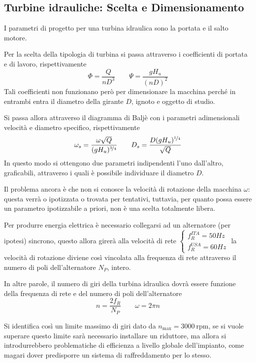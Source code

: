 \documentclass[a4paper, 15pt]{article}
\begin{document}
\subsection{Turbine idrauliche: Scelta e Dimensionamento}		
\begin{adjustwidth}{2in}{}
	I parametri di progetto per una turbina idraulica sono la portata e il salto motore. 
	
	Per la scelta della tipologia di turbina si passa attraverso i coefficienti di portata e di lavoro, rispettivamente
	\[\Phi = \dfrac{Q}{nD^3}\qquad\Psi=\dfrac{gH_u}{(nD)^2}\]
	Tali coefficienti non funzionano però per dimensionare la macchina perché in entrambi entra il diametro della girante $D$, ignoto e oggetto di studio. \newline 
	
	Si passa allora attraverso il diagramma di Baljè con i parametri adimensionali velocità e diametro specifico, rispettivamente
	\[\omega_s = \dfrac{\omega\sqrt{Q}}{(gH_u)^{\nicefrac{3}{4}}}\qquad D_s = \dfrac{D(gH_u)^{\nicefrac{1}{4}}}{\sqrt{Q}}\]
	In questo modo si ottengono due parametri indipendenti l'uno dall'altro, graficabili, attraverso i quali è possibile individuare il diametro $D$. \newline 
	
	Il problema ancora è che non si conosce la velocità di rotazione della macchina $\omega$: questa verrà o ipotizzata o trovata per tentativi, tuttavia, per quanto possa essere un parametro ipotizzabile a priori, non è una scelta totalmente libera. 
	
	Per produrre energia elettrica è necessario collegarsi ad un alternatore (per ipotesi) sincrono, questo allora girerà alla velocità di rete $\begin{cases}
		f^{ITA}_R = 50 Hz \\
		f^{USA}_R = 60 Hz
	\end{cases}$ la velocità di rotazione diviene così vincolata alla frequenza di rete attraverso il numero di poli dell'alternatore $N_P$, intero. 

	In altre parole, il numero di giri della turbina idraulica dovrà essere funzione della frequenza di rete e del numero di poli dell'alternatore
	\[n = \dfrac{2f_R}{N_P}\qquad\omega = 2\pi n\]
	
	Si identifica così un limite massimo di giri dato da $n_{\max} = 3000~\text{rpm}$, se si vuole superare questo limite sarà necessario installare un riduttore, ma allora si introdurrebbero problematiche di efficienza a livello globale dell'impianto, come magari dover predisporre un sistema di raffreddamento per lo stesso. 
	

\end{adjustwidth}
\end{document}

